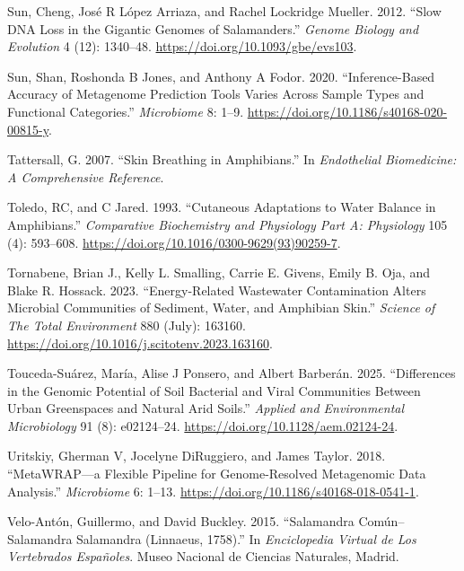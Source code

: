 \documentclass[
  12pt,
]{article}
\newlength{\cslhangindent}
\newenvironment{CSLReferences}[2] %
 {\begin{list}{}{%
  \setlength{\itemindent}{0pt}
  \setlength{\leftmargin}{0pt}
  \setlength{\parsep}{0pt}
  \ifodd #1
   \setlength{\leftmargin}{\cslhangindent}
   \setlength{\itemindent}{-1\cslhangindent}
  \fi
  \setlength{\itemsep}{#2\baselineskip}}}
 {\end{list}}
\begin{document}
\begin{CSLReferences}{1}{1}
Sun, Cheng, José R López Arriaza, and Rachel Lockridge Mueller. 2012.
{``Slow {DNA} Loss in the Gigantic Genomes of Salamanders.''}
\emph{Genome Biology and Evolution} 4 (12): 1340--48.
\url{https://doi.org/10.1093/gbe/evs103}.

Sun, Shan, Roshonda B Jones, and Anthony A Fodor. 2020.
{``Inference-Based Accuracy of Metagenome Prediction Tools Varies Across
Sample Types and Functional Categories.''} \emph{Microbiome} 8: 1--9.
\url{https://doi.org/10.1186/s40168-020-00815-y}.

Tattersall, G. 2007. {``Skin Breathing in Amphibians.''} In
\emph{Endothelial Biomedicine: A Comprehensive Reference}.

Toledo, RC, and C Jared. 1993. {``Cutaneous Adaptations to Water Balance
in Amphibians.''} \emph{Comparative Biochemistry and Physiology Part A:
Physiology} 105 (4): 593--608.
\url{https://doi.org/10.1016/0300-9629(93)90259-7}.

Tornabene, Brian J., Kelly L. Smalling, Carrie E. Givens, Emily B. Oja,
and Blake R. Hossack. 2023. {``Energy-Related Wastewater Contamination
Alters Microbial Communities of Sediment, Water, and Amphibian Skin.''}
\emph{Science of The Total Environment} 880 (July): 163160.
\url{https://doi.org/10.1016/j.scitotenv.2023.163160}.

Touceda-Suárez, María, Alise J Ponsero, and Albert Barberán. 2025.
{``Differences in the Genomic Potential of Soil Bacterial and Viral
Communities Between Urban Greenspaces and Natural Arid Soils.''}
\emph{Applied and Environmental Microbiology} 91 (8): e02124--24.
\url{https://doi.org/10.1128/aem.02124-24}.

Uritskiy, Gherman V, Jocelyne DiRuggiero, and James Taylor. 2018.
{``{MetaWRAP}---a Flexible Pipeline for Genome-Resolved Metagenomic Data
Analysis.''} \emph{Microbiome} 6: 1--13.
\url{https://doi.org/10.1186/s40168-018-0541-1}.

Velo-Antón, Guillermo, and David Buckley. 2015. {``Salamandra
Común--{Salamandra} Salamandra ({Linnaeus}, 1758).''} In
\emph{Enciclopedia {Virtual} de Los {Vertebrados} {Españoles}}. Museo
Nacional de Ciencias Naturales, Madrid.


\end{CSLReferences}
\end{document}
